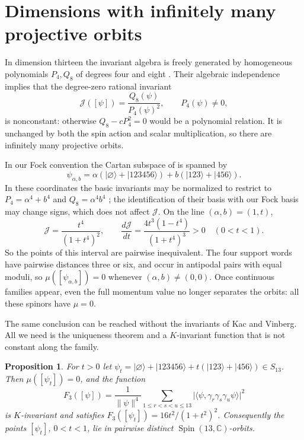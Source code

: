\documentclass{article}
\newtheorem{proposition}[theorem]{Proposition}
\theoremstyle{definition}
\theoremstyle{remark}
\newcommand{\C}{\mathbb C}
\newcommand{\Spin}{\operatorname{Spin}}
\newcommand{\ket}[1]{\lvert #1\rangle}
\newcommand{\norm}[1]{\lVert #1\rVert}
\begin{document}
\section{Dimensions with infinitely many projective orbits}
\label{sec:finite-boundary}

In dimension thirteen the invariant algebra is freely generated by
homogeneous polynomials $P_4,Q_8$ of degrees four and eight
\cite[Theorem~1]{Gatti_dim13}. Their algebraic independence
implies that the degree-zero rational invariant
\[
 \mathcal J([\psi])=\frac{Q_8(\psi)}{P_4(\psi)^2},
 \qquad P_4(\psi)\ne0,
\]
is nonconstant: otherwise $Q_8-cP_4^2=0$ would be a polynomial relation.
It is unchanged by both the spin action and scalar multiplication, so
there are infinitely many projective orbits.

In our Fock convention the Cartan subspace of
\cite[Proposition~10]{Gatti_dim13} is spanned by
\[
 \psi_{\alpha,b}=\alpha(\ket\varnothing+\ket{123456})
                 +b(\ket{123}+\ket{456}).
\]
In these coordinates the basic invariants may be normalized to restrict to
$P_4=\alpha^4+b^4$ and $Q_8=\alpha^4b^4$
\cite[Sections~3.2--3.3]{Gatti_dim13}; the identification of their basis
with our Fock basis may change signs, which does not affect $\mathcal J$. On the line $(\alpha,b)=(1,t)$,
\[
 \mathcal J=\frac{t^4}{(1+t^4)^2},\qquad
 \frac{d\mathcal J}{dt}=\frac{4t^3(1-t^4)}{(1+t^4)^3}>0
 \quad(0<t<1).
\]
So the points of this interval are pairwise inequivalent. The four support words have pairwise distances three or six,
and occur in antipodal pairs with equal moduli, so
$\mu([\psi_{\alpha,b}])=0$ whenever $(\alpha,b)\ne(0,0)$.
Once continuous families appear, even the full momentum value no longer
separates the orbits: all these spinors have $\mu=0$.

The same conclusion can be reached without the invariants of Kac and
Vinberg. All we need is the uniqueness theorem and a $K$-invariant function
that is not constant along the family.

\begin{proposition}
\label{prop:spin13-moment}
For $t>0$ let $\psi_t=\ket\varnothing+\ket{123456}+t(\ket{123}+\ket{456})\in
S_{13}$. Then $\mu([\psi_t])=0$, and the function
\begin{equation}
 F_3([\psi])=\frac1{\norm\psi^4}\sum_{1\le r<s<u\le13}
 \bigl\lvert\langle\psi,\gamma_r\gamma_s\gamma_u\psi\rangle\bigr\rvert^2
 \label{eq:clifford-moment}
\end{equation}
is $K$-invariant and satisfies $F_3([\psi_t])=16t^2/(1+t^2)^2$. Consequently
the points $[\psi_t]$, $0<t<1$, lie in pairwise distinct
$\Spin(13,\C)$-orbits.
\end{proposition}
\end{document}
